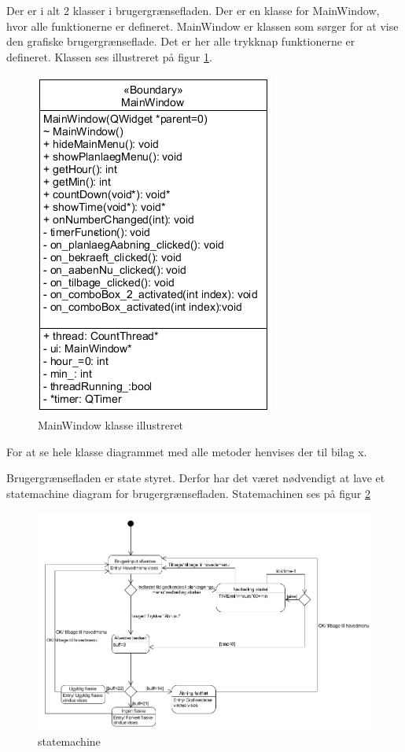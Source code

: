 Der er i alt 2 klasser i brugergrænsefladen. Der er en klasse for MainWindow, hvor alle funktionerne er defineret. MainWindow er klassen som sørger for at vise den grafiske brugergrænseflade. Det er her alle trykknap funktionerne er defineret. Klassen ses illustreret på figur \ref{MW_CD}. 

\begin{figure}[H]
	\centerline{\includegraphics[scale=1]{tex/Design/GUI/Fotos/MainWindow}}
	\caption{MainWindow klasse illustreret}
	\label{MW_CD}
\end{figure}

For at se hele klasse diagrammet med alle metoder henvises der til bilag x.

Brugergrænsefladen er state styret. Derfor har det været nødvendigt at lave et statemachine diagram for brugergrænsefladen. Statemachinen ses på figur \ref{sm}\\

\begin{figure}[H]
	\centerline{\includegraphics[scale=1]{tex/Design/GUI/Fotos/sm}}
	\caption{statemachine}
	\label{sm}
\end{figure}

